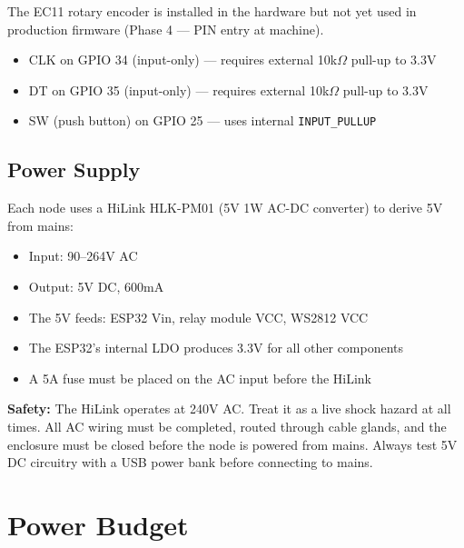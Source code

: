 The EC11 rotary encoder is installed in the hardware but not yet used in production firmware (Phase 4 --- PIN entry at machine).

\begin{itemize}[leftmargin=1.5em]
    \item CLK on GPIO 34 (input-only) --- requires external 10k$\Omega$ pull-up to 3.3V
    \item DT on GPIO 35 (input-only) --- requires external 10k$\Omega$ pull-up to 3.3V
    \item SW (push button) on GPIO 25 --- uses internal \texttt{INPUT\_PULLUP}
\end{itemize}

\subsection{Power Supply}

Each node uses a HiLink HLK-PM01 (5V 1W AC-DC converter) to derive 5V from mains:

\begin{itemize}[leftmargin=1.5em]
    \item Input: 90--264V AC
    \item Output: 5V DC, 600mA
    \item The 5V feeds: ESP32 Vin, relay module VCC, WS2812 VCC
    \item The ESP32's internal LDO produces 3.3V for all other components
    \item A 5A fuse must be placed on the AC input before the HiLink
\end{itemize}

\begin{warnbox}
\textbf{Safety:} The HiLink operates at 240V AC. Treat it as a live shock hazard at all times. All AC wiring must be completed, routed through cable glands, and the enclosure must be closed before the node is powered from mains. Always test 5V DC circuitry with a USB power bank before connecting to mains.
\end{warnbox}

\section{Power Budget}


